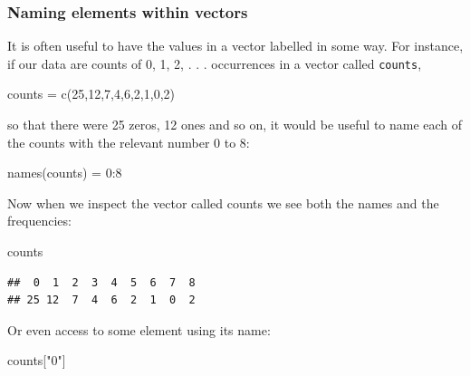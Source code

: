 \documentclass[
]{book}
\newenvironment{Shaded}{\begin{snugshade}}{\end{snugshade}}
\newcommand{\DecValTok}[1]{\textcolor[rgb]{0.00,0.00,0.81}{#1}}
\newcommand{\FunctionTok}[1]{\textcolor[rgb]{0.00,0.00,0.00}{#1}}
\newcommand{\NormalTok}[1]{#1}
\newcommand{\OtherTok}[1]{\textcolor[rgb]{0.56,0.35,0.01}{#1}}
\newcommand{\SpecialCharTok}[1]{\textcolor[rgb]{0.00,0.00,0.00}{#1}}
\newcommand{\StringTok}[1]{\textcolor[rgb]{0.31,0.60,0.02}{#1}}
\theoremstyle{definition}
\theoremstyle{definition}
\theoremstyle{definition}
\theoremstyle{definition}
\theoremstyle{remark}
\begin{document}
\hypertarget{naming-elements-within-vectors}{%
\subsubsection{Naming elements within vectors}\label{naming-elements-within-vectors}}

It is often useful to have the values in a vector labelled in some way. For instance, if our data are counts of 0, 1, 2, . . . occurrences in a vector called \texttt{counts},

\begin{Shaded}
\begin{Highlighting}[]
\NormalTok{counts }\OtherTok{=} \FunctionTok{c}\NormalTok{(}\DecValTok{25}\NormalTok{,}\DecValTok{12}\NormalTok{,}\DecValTok{7}\NormalTok{,}\DecValTok{4}\NormalTok{,}\DecValTok{6}\NormalTok{,}\DecValTok{2}\NormalTok{,}\DecValTok{1}\NormalTok{,}\DecValTok{0}\NormalTok{,}\DecValTok{2}\NormalTok{)}
\end{Highlighting}
\end{Shaded}

so that there were 25 zeros, 12 ones and so on, it would be useful to name each of the counts with the relevant number 0 to 8:

\begin{Shaded}
\begin{Highlighting}[]
\FunctionTok{names}\NormalTok{(counts) }\OtherTok{=} \DecValTok{0}\SpecialCharTok{:}\DecValTok{8}
\end{Highlighting}
\end{Shaded}

Now when we inspect the vector called counts we see both the names and the frequencies:

\begin{Shaded}
\begin{Highlighting}[]
\NormalTok{counts}
\end{Highlighting}
\end{Shaded}

\begin{verbatim}
##  0  1  2  3  4  5  6  7  8 
## 25 12  7  4  6  2  1  0  2
\end{verbatim}

Or even access to some element using its name:

\begin{Shaded}
\begin{Highlighting}[]
\NormalTok{counts[}\StringTok{"0"}\NormalTok{]}
\end{Highlighting}
\end{Shaded}
\end{document}
